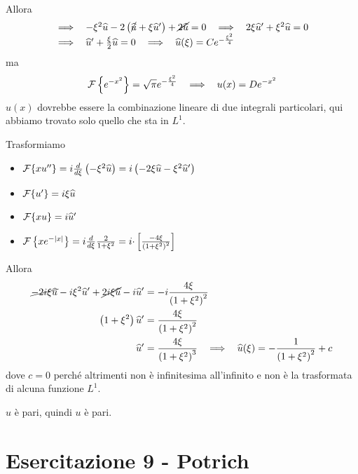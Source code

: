 Allora
\begin{equation*}
\begin{array}{ l }
\implies \ \ -\xi ^{2}\hat{u} -2\left(\cancel{\hat{u}} +\xi \hat{u} '\right) +\cancel{2\hat{u}} =0\ \ \implies \ \ 2\xi \hat{u} '+\xi ^{2}\hat{u} =0\\
\implies \ \ \hat{u} '+\frac{\xi }{2}\hat{u} =0\ \ \implies \ \ \hat{u}( \xi ) =Ce^{-\frac{\xi ^{2}}{4}}
\end{array}
\end{equation*}
ma
\begin{equation*}
\Fc \left\{e^{-x^{2}}\right\} =\sqrt{\pi } e^{-\frac{\xi ^{2}}{4}} \ \ \implies \ \ u( x) =De^{-x^{2}}
\end{equation*}
$u( x)$ dovrebbe essere la combinazione lineare di due integrali particolari, qui abbiamo trovato solo quello che sta in $L^{1}$.
\Soluzione

Trasformiamo
\begin{itemize}
\item $\Fc \{xu''\} =i\frac{d}{d\xi }\left( -\xi ^{2}\hat{u}\right) =i\left( -2\xi \hat{u} -\xi ^{2}\hat{u} '\right)$
\item $\Fc \{u'\} =i\xi \hat{u}$
\item $\Fc \{xu\} =i\hat{u} '$
\item $\Fc \left\{xe^{-| x| }\right\} =i\frac{d}{d\xi }\frac{2}{1+\xi ^{2}} =i\cdotp \left[\frac{-4\xi }{\left( 1+\xi ^{2}\right)^{2}}\right]$
\end{itemize}

Allora
\begin{equation*}
\begin{aligned}
\cancel{-2i\xi \hat{u}} -i\xi ^{2}\hat{u} '+\cancel{2i\xi \hat{u}} -i\hat{u} ' & =-i\frac{4\xi }{\left( 1+\xi ^{2}\right)^{2}}\\
\left( 1+\xi ^{2}\right)\hat{u} ' & =\frac{4\xi }{\left( 1+\xi ^{2}\right)^{2}}\\
\hat{u} ' & =\frac{4\xi }{\left( 1+\xi ^{2}\right)^{3}} \ \ \implies \ \ \hat{u}( \xi ) =-\frac{1}{\left( 1+\xi ^{2}\right)^{2}} +c
\end{aligned}
\end{equation*}
dove $c=0$ perché altrimenti non è infinitesima all'infinito e non è la trasformata di alcuna funzione $L^{1}$.

$\hat{u}$ è pari, quindi $u$ è pari.
\chapter{Esercitazione 9 - Potrich}
\ParteEsercizi
\Esercizio{}

